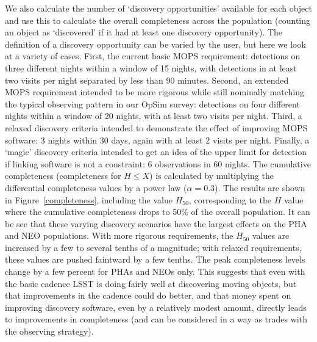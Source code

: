 \documentclass{iau}
\begin{document}
We also calculate the number of `discovery opportunities' available
for each object and use this to calculate the overall completeness
across the population (counting an object as `discovered' if it had at
least one discovery opportunity). The definition of a discovery
opportunity can be varied by the user, but here we look at a variety
of cases. First, the current basic MOPS requirement: detections on
three different nights within a window of 15 nights, with detections
in at least two visits per night separated by less than 90
minutes. Second, an extended MOPS requirement intended to be more
rigorous while still nominally matching the typical observing pattern
in our OpSim survey: detections on four different nights within a
window of 20 nights, with at least two visits per night. Third, a
relaxed discovery criteria intended to demonstrate the effect of
improving MOPS software: 3 nights within 30 days, again with at least
2 visits per night. Finally, a `magic' discovery criteria intended to
get an idea of the upper limit for detection if linking software is not a
constraint: 6 observations in 60 nights. The cumulative completeness (completeness for $H
\le X$) is calculated by multiplying the differential completeness
values by a power law ($\alpha=0.3$). The results are shown in
Figure~\ref{completeness}, including the value $H_{50}$, corresponding
to the $H$ value where the cumulative completeness drops to 50\% of
the overall population. It can be see that these varying discovery
scenarios have the largest effects on the PHA and NEO
populations. With more rigorous requirements, the $H_{50}$ values are
increased by a few to several tenths of a magnitude; with relaxed
requirements, these values are pushed faintward by a few tenths. The
peak completeness levels change by a few percent for PHAs and NEOs
only. This suggests that even with the basic cadence LSST is doing
fairly well at discovering moving objects, but that improvements in
the cadence could do better, and that money spent on improving
discovery software, even by a relatively modest amount, directly leads
to improvements in completeness (and can be considered in a way as
trades with the observing strategy).
\end{document}
